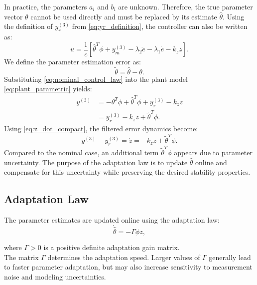 In practice, the parameters \(a_i\) and \(b_i\) are unknown. Therefore, the true parameter vector \(\theta\) cannot be used directly and must be replaced by its estimate \(\hat{\theta}\). Using the definition of \(y_r^{(3)}\) from \eqref{eq:yr_definition}, the controller can also be written as:
\begin{equation}
u
=
\frac{1}{c}
\left[
\hat{\theta}^{T}\phi
+
y_m^{(3)}
-
\lambda_2\ddot{e}
-
\lambda_1\dot{e}
-
k_z z
\right].
\end{equation}
We define the parameter estimation error as:
\begin{equation}
\tilde{\theta}
=
\hat{\theta}
-
\theta.
\end{equation}
Substituting \eqref{eq:nominal_control_law} into the plant model \eqref{eq:plant_parametric} yields:
\begin{align}
y^{(3)}
&=
-\theta^T\phi
+
\hat{\theta}^{T}\phi
+
y_r^{(3)}
-
k_z z \\
&=
y_r^{(3)}
-
k_z z
+
\tilde{\theta}^{T}\phi.
\label{eq:adaptive_control_law}
\end{align}
Using \eqref{eq:z_dot_compact}, the filtered error dynamics become:
\begin{equation}
y^{(3)} - y_r^{(3)}
=
\dot{z}
=
-k_z z
+
\tilde{\theta}^{T}\phi.
\label{eq:z_dynamics}
\end{equation}
Compared to the nominal case, an additional term \(\tilde{\theta}^{T}\phi\) appears due to parameter uncertainty. The purpose of the adaptation law is to update \(\hat{\theta}\) online and compensate for this uncertainty while preserving the desired stability properties.

\subsection{Adaptation Law}

The parameter estimates are updated online using the adaptation law:
\begin{equation}
\dot{\hat{\theta}}
=
-\Gamma \phi z,
\label{eq:adaptation_law}
\end{equation}

where \(\Gamma>0\) is a positive definite adaptation gain matrix.
\\

\noindent The matrix \(\Gamma\) determines the adaptation speed. Larger values of \(\Gamma\) generally lead to faster parameter adaptation, but may also increase sensitivity to measurement noise and modeling uncertainties.

